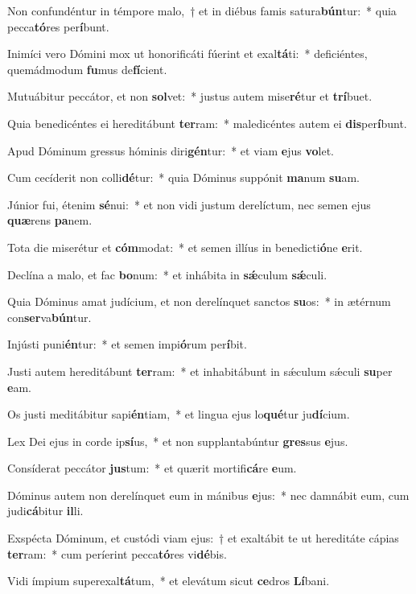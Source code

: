 \item Non confundéntur in témpore malo,~† et in diébus famis satura\textbf{bún}tur:~* quia pecca\textbf{tó}res per\textbf{í}bunt.
\item Inimíci vero Dómini mox ut honorificáti fúerint et exal\textbf{tá}ti:~* deficiéntes, quemádmodum \textbf{fu}mus de\textbf{fí}cient.
\item Mutuábitur peccátor, et non \textbf{sol}vet:~* justus autem mise\textbf{ré}tur et \textbf{trí}buet.
\item Quia benedicéntes ei hereditábunt \textbf{ter}ram:~* maledicéntes autem ei \textbf{dis}per\textbf{í}bunt.
\item Apud Dóminum gressus hóminis diri\textbf{gén}tur:~* et viam \textbf{e}jus \textbf{vo}let.
\item Cum cecíderit non colli\textbf{dé}tur:~* quia Dóminus suppónit \textbf{ma}num \textbf{su}am.
\item Júnior fui, étenim \textbf{sé}nui:~* et non vidi justum derelíctum, nec semen ejus \textbf{quæ}rens \textbf{pa}nem.
\item Tota die miserétur et \textbf{cóm}modat:~* et semen illíus in benedicti\textbf{ó}ne \textbf{e}rit.
\item Declína a malo, et fac \textbf{bo}num:~* et inhábita in \textbf{sǽ}culum \textbf{sǽ}culi.
\item Quia Dóminus amat judícium, et non derelínquet sanctos \textbf{su}os:~* in ætérnum con\textbf{ser}va\textbf{bún}tur.
\item Injústi puni\textbf{én}tur:~* et semen impi\textbf{ó}rum per\textbf{í}bit.
\item Justi autem hereditábunt \textbf{ter}ram:~* et inhabitábunt in sǽculum sǽculi \textbf{su}per \textbf{e}am.
\item Os justi meditábitur sapi\textbf{én}tiam,~* et lingua ejus lo\textbf{qué}tur ju\textbf{dí}cium.
\item Lex Dei ejus in corde ip\textbf{sí}us,~* et non supplantabúntur \textbf{gres}sus \textbf{e}jus.
\item Consíderat peccátor \textbf{jus}tum:~* et quærit mortifi\textbf{cá}re \textbf{e}um.
\item Dóminus autem non derelínquet eum in mánibus \textbf{e}jus:~* nec damnábit eum, cum judi\textbf{cá}bitur \textbf{il}li.
\item Exspécta Dóminum, et custódi viam ejus:~† et exaltábit te ut hereditáte cápias \textbf{ter}ram:~* cum períerint pecca\textbf{tó}res vi\textbf{dé}bis.
\item Vidi ímpium superexal\textbf{tá}tum,~* et elevátum sicut \textbf{ce}dros \textbf{Lí}bani.
